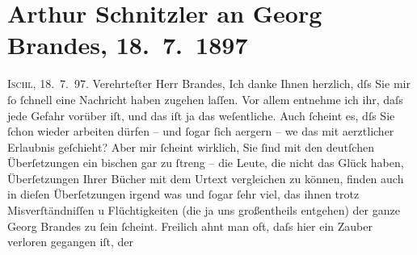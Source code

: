 

         
         \renewcommand{\erwaehntePersonen}{Personen: Peter Altenberg, Richard Beer-Hofmann, Georg Brandes, Paul Goldmann}
         \renewcommand{\erwaehnteInstitutionen}{Institutionen: Frankfurter Zeitung}
         \renewcommand{\erwaehnteOrte}{Orte: Bad Ischl, Dänemark, Kopenhagen, Paris, Wien}
         \renewcommand{\erwaehnteWerke}{Werke: Wie ich es sehe}
               \section[Arthur Schnitzler an Georg Brandes, 18. 7. 1897]{ Arthur Schnitzler an Georg Brandes, 18. 7. 1897}\nopagebreak{}\rehead{ }\begin{ledgroupsized}[t]{13cm}\normalsize\beginnumbering \toendnotes[C]{\smallbreak\pagebreak[2]} 
\pstart
           \raggedleft{}{\pb}\textsc{Ischl}, 18. 7. 97. \pend
           \pstart{}Verehrteſter Herr Brandes,\pend\pstart
           Ich danke Ihnen herzlich, dſs Sie mir ſo ſchnell eine Nachricht haben zugehen
                    laſſen. Vor allem entnehme ich ihr, daſs jede Gefahr vorüber iſt, und das iſt ja
                    das weſentliche. Auch ſcheint es, dſs Sie ſchon wieder arbeiten dürfen – und
                    ſogar ſich aergern – we{\geminationn} das mit aerztlicher {\pb}Erlaubnis geſchieht? Aber mir ſcheint
                    wirklich, Sie ſind mit den deutſchen Überſetzungen ein bischen gar zu ſtreng –
                    die Leute, die nicht das Glück haben, Überſetzungen Ihrer Bücher mit dem Urtext
                    vergleichen zu können, finden auch in dieſen Überſetzungen irgend was und ſogar
                    ſehr viel, das \introOben{}ihnen\introOben{} trotz Misverſtändniſſen u
                    Flüchtigkeiten (die ja uns \introOben{}großentheils\introOben{} entgehen) der
                    ganze Georg Brandes zu ſein ſcheint. {\pb}Freilich ahnt man oft, daſs hier ein Zauber verloren gegangen iſt, der

\end{ledgroupsized}
